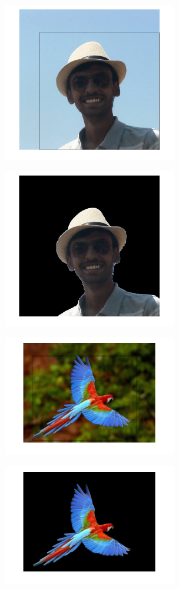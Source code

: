 \documentclass[a4paper]{article}
\begin{document}
\begin{figure}[h]
\begin{subfigure}{.5\textwidth}
  \centering
  \includegraphics[width = 3in]{varun_input_g.png}
  \label{fig:sfig2}
\end{subfigure}
\begin{subfigure}{.5\textwidth}
  \centering
  \includegraphics[width = 3in]{varun_output_g.png}
  \label{fig:sfig2}
\end{subfigure}

\begin{subfigure}{.5\textwidth}
  \centering
  \includegraphics[width = 3in]{parrot_input_g.png}
  \label{fig:sfig2}
\end{subfigure}
\begin{subfigure}{.5\textwidth}
  \centering
  \includegraphics[width = 3in]{parrot_output_g.png}
  \label{fig:sfig2}
\end{subfigure}


\end{figure}
\end{document}
